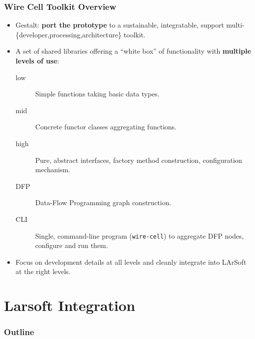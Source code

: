 \documentclass[xcolor=dvipsnames]{beamer}
\begin{document}
\begin{frame}
  \frametitle{Wire Cell Toolkit Overview}
  \begin{itemize}
  \item Gestalt: \textbf{port the prototype} to a sustainable, integratable,
    support multi-\{developer,processing,architecture\} toolkit.
  \item A set of shared libraries offering a ``white box'' of functionality with \textbf{multiple levels of use}:
    \begin{description}
    \item[low] Simple functions taking basic data types.
    \item[mid] Concrete functor classes aggregating functions.
    \item[high] Pure, abstract interfaces, factory method construction, configuration mechanism.
    \item[DFP] Data-Flow Programming graph construction.
    \item[CLI] Single, command-line program (\texttt{wire-cell}) to
      aggregate DFP nodes, configure and run them.
    \end{description}
  \item Focus on development details at all levels and cleanly
    integrate into LArSoft at the right levels.
  \end{itemize}

\end{frame}
\section{Larsoft Integration}

\begin{frame}
  \frametitle{Outline}
  \tableofcontents[currentsection]
\end{frame}
\end{document}
